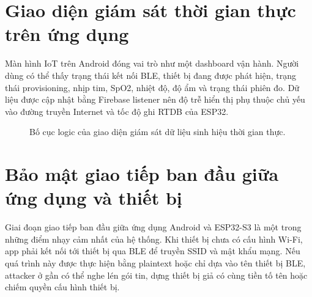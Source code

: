 \documentclass[a4paper,13pt,3p,oneside]{report}
\begin{document}
\section{Giao diện giám sát thời gian thực trên ứng dụng}
Màn hình IoT trên Android đóng vai trò như một dashboard vận hành. Người dùng có thể thấy trạng thái kết nối BLE, thiết bị đang được phát hiện, trạng thái provisioning, nhịp tim, SpO2, nhiệt độ, độ ẩm và trạng thái phiên đo. Dữ liệu được cập nhật bằng Firebase listener nên độ trễ hiển thị phụ thuộc chủ yếu vào đường truyền Internet và tốc độ ghi RTDB của ESP32.

\begin{figure}[H]
    \centering
    \caption{Bố cục logic của giao diện giám sát dữ liệu sinh hiệu thời gian thực.}
\end{figure}

\section{Bảo mật giao tiếp ban đầu giữa ứng dụng và thiết bị}

Giai đoạn giao tiếp ban đầu giữa ứng dụng Android và ESP32-S3 là một trong những điểm nhạy cảm nhất của hệ thống. Khi thiết bị chưa có cấu hình Wi-Fi, app phải kết nối tới thiết bị qua BLE để truyền SSID và mật khẩu mạng. Nếu quá trình này được thực hiện bằng plaintext hoặc chỉ dựa vào tên thiết bị BLE, attacker ở gần có thể nghe lén gói tin, dựng thiết bị giả có cùng tiền tố tên hoặc chiếm quyền cấu hình thiết bị.
\end{document}
